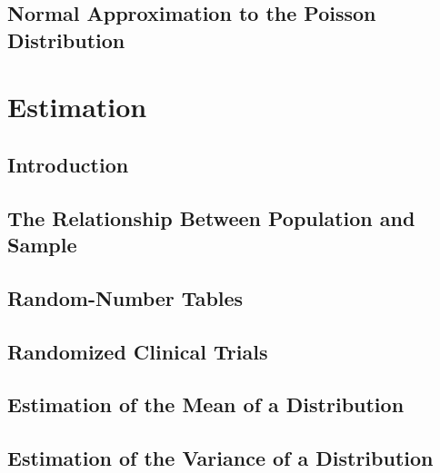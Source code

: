 \documentclass[12pt,]{article}
\begin{document}
\hypertarget{normal-approximation-to-the-poisson-distribution}{%
\subsection{Normal Approximation to the Poisson
Distribution}\label{normal-approximation-to-the-poisson-distribution}}

\hypertarget{estimation}{%
\section{Estimation}\label{estimation}}

\hypertarget{introduction-2}{%
\subsection{Introduction}\label{introduction-2}}

\hypertarget{the-relationship-between-population-and-sample}{%
\subsection{The Relationship Between Population and
Sample}\label{the-relationship-between-population-and-sample}}

\hypertarget{random-number-tables}{%
\subsection{Random-Number Tables}\label{random-number-tables}}

\hypertarget{randomized-clinical-trials}{%
\subsection{Randomized Clinical
Trials}\label{randomized-clinical-trials}}

\hypertarget{estimation-of-the-mean-of-a-distribution}{%
\subsection{Estimation of the Mean of a
Distribution}\label{estimation-of-the-mean-of-a-distribution}}

\hypertarget{estimation-of-the-variance-of-a-distribution}{%
\subsection{Estimation of the Variance of a
Distribution}\label{estimation-of-the-variance-of-a-distribution}}
\end{document}
